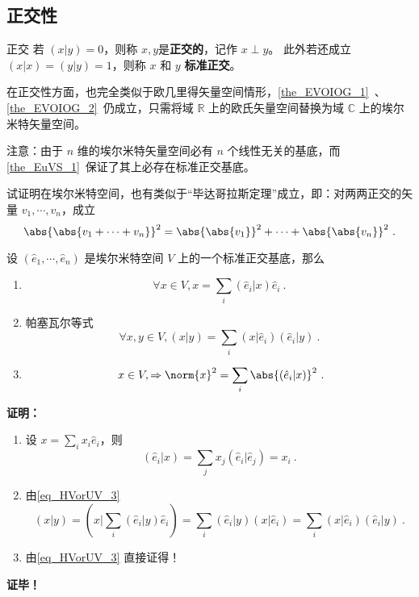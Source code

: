 \subsection{正交性}
\begin{definition}{正交}
若 $(  x|  y)=0$，则称 $  x,  y$是\textbf{正交的}，记作 $  x\perp  y$。
此外若还成立 $(  x|  x)=(  y|  y)=1$，则称 $  x$ 和 $  y$ \textbf{标准正交}。
\end{definition}
在正交性方面，也完全类似于欧几里得矢量空间情形，\autoref{the_EVOIOG_1}~、\autoref{the_EVOIOG_2}~仍成立，只需将域 $\mathbb{R}$ 上的欧氏矢量空间替换为域 $\mathbb{C}$ 上的埃尔米特矢量空间。

注意：由于 $n$ 维的埃尔米特矢量空间必有 $n$ 个线性无关的基底，而\autoref{the_EuVS_1}~保证了其上必存在标准正交基底。
\begin{example}{}
试证明在埃尔米特空间，也有类似于“毕达哥拉斯定理”成立，即：对两两正交的矢量 $  v_1,\cdots,  v_n$，成立
\begin{equation}
\abs{\abs{  v_1+\cdots+  v_n}}^2=\abs{\abs{  v_1}}^2+\cdots+\abs{\abs{  v_n}}^2~.
\end{equation}
\end{example}

\begin{theorem}{}
设 $(\hat e_1,\cdots, \hat e_n)$ 是埃尔米特空间 $V$ 上的一个标准正交基底，那么
\begin{enumerate}
\item \begin{equation}\label{eq_HVorUV_3}
\forall  x\in V,  x=\sum_{i}( \hat e_i|  x)\hat e_i~.
\end{equation}
\item 帕塞瓦尔等式
\begin{equation}
\forall  x,  y\in V,(  x|  y)=\sum_{i}(  x|\hat e_i)(  \hat e_i|  y)~.
\end{equation}
\item \begin{equation}
\  x\in V,\Rightarrow\norm{  x}^2=\sum_{i}\abs{(  \hat e_i|  x)}^2~.
\end{equation}
\end{enumerate}
\end{theorem}
\textbf{证明：}\begin{enumerate}
\item 设 $  x=\sum_{i}x_i 
 \hat e_i$，则
\begin{equation}
( \hat e_i|  x)=\sum_{j}x_j( \hat e_i| \hat e_j)=x_i~.
\end{equation}
\item 由\autoref{eq_HVorUV_3} 
\begin{equation}
(  x|  y)=(  x|\sum_{i}( \hat e_i|  y) \hat e_i)=\sum_{i}( \hat e_i|  y)(  x| \hat e_i)=\sum_{i}(  x| \hat e_i)( \hat e_i|  y)~.
\end{equation}
\item 由\autoref{eq_HVorUV_3} 直接证得！
\end{enumerate}
\textbf{证毕！}
